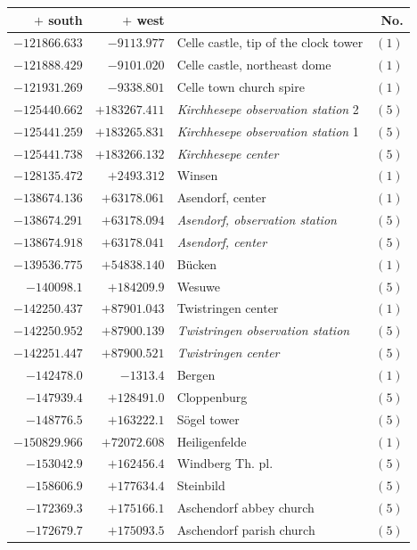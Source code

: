 \clearpage{}%
\begin{center}\begingroup\fontsize{8}{9}\selectfont
\setlength{\tabcolsep}{4pt}
\begin{tabular}{r|r|p{170pt}|r}\hline
\(+\) south&\(+\) west&&No.\\\hline
\(-121866.633\)&\(-9113.977\)&Celle castle, tip of the clock tower&\((1)\)\\
\(-121888.429\)&\(-9101.020\)&Celle castle, northeast dome&\((1)\)\\
\(-121931.269\)&\(-9338.801\)&Celle town church spire&\((1)\)\\
\(-125440.662\)&\(+183267.411\)&\textit{Kirchhesepe observation station} 2&\((5)\)\\
\(-125441.259\)&\(+183265.831\)&\textit{Kirchhesepe observation station} 1&\((5)\)\\
\(-125441.738\)&\(+183266.132\)&\textit{Kirchhesepe center}&\((5)\)\\
\(-128135.472\)&\(+2493.312\)&Winsen&\((1)\)\\
\(-138674.136\)&\(+63178.061\)&Asendorf, center&\((1)\)\\
\(-138674.291\)&\(+63178.094\)&\textit{Asendorf, observation station}&\((5)\)\\
\(-138674.918\)&\(+63178.041\)&\textit{Asendorf, center}&\((5)\)\\
\(-139536.775\)&\(+54838.140\)&Bücken&\((1)\)\\
\(-140098.1\)&\(+184209.9\)&Wesuwe&\((5)\)\\
\(-142250.437\)&\(+87901.043\)&Twistringen center&\((1)\)\\
\(-142250.952\)&\(+87900.139\)&\textit{Twistringen observation station}&\((5)\)\\
\(-142251.447\)&\(+87900.521\)&\textit{Twistringen center}&\((5)\)\\
\(-142478.0\)&\(-1313.4\)&Bergen&\((1)\)\\
\(-147939.4\)&\(+128491.0\)&Cloppenburg&\((5)\)\\
\(-148776.5\)&\(+163222.1\)&Sögel tower&\((5)\)\\
\(-150829.966\)&\(+72072.608\)&Heiligenfelde&\((1)\)\\
\(-153042.9\)&\(+162456.4\)&Windberg Th. pl.&\((5)\)\\
\(-158606.9\)&\(+177634.4\)&Steinbild&\((5)\)\\
\(-172369.3\)&\(+175166.1\)&Aschendorf abbey church&\((5)\)\\
\(-172679.7\)&\(+175093.5\)&Aschendorf parish church&\((5)\)\\

\end{tabular}
\end{center}
